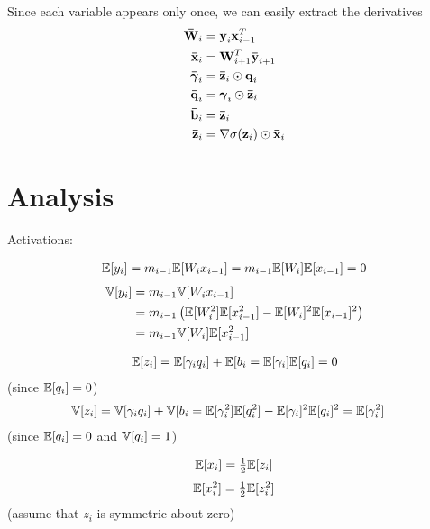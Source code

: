 Since each variable appears only once, we can easily extract the derivatives
\begin{align}
\boldsymbol{\mathbf{\bar{W}}}_{i} & = \boldsymbol{\mathbf{\bar{y}}}_{i} \boldsymbol{\mathbf{x}}_{i - 1}^T \\
\boldsymbol{\mathbf{\bar{x}}}_{i} & = \boldsymbol{\mathbf{W}}_{i+1}^{T} \boldsymbol{\mathbf{\bar{y}}}_{i+1} \\
\boldsymbol{\mathbf{\bar{\gamma}}}_{i} & = \boldsymbol{\mathbf{\bar{z}}}_{i} \odot \boldsymbol{\mathbf{q}}_{i} \\
\boldsymbol{\mathbf{\bar{q}}}_{i} & = \boldsymbol{\mathbf{\gamma}}_{i} \odot \boldsymbol{\mathbf{\bar{z}}}_{i} \\
\boldsymbol{\mathbf{\bar{b}}}_{i} & = \boldsymbol{\mathbf{\bar{z}}}_{i} \\
\boldsymbol{\mathbf{\bar{z}}}_{i} & = \nabla\sigma(\boldsymbol{\mathbf{z}}_{i}) \odot \boldsymbol{\mathbf{\bar{x}}}_{i}
\end{align}

\section{Analysis}

Activations:

\begin{align}
\mathbb{E}[y_{i}] = m_{i-1} \mathbb{E}[W_{i} x_{i-1}] = m_{i-1} \mathbb{E}[W_{i}] \mathbb{E}[x_{i-1}] = 0
\end{align}
\begin{align}
\mathbb{V}[y_{i}] & = m_{i-1} \mathbb{V}[W_{i} x_{i-1}] \\
  & = m_{i-1} \left( \mathbb{E}[W_{i}^2] \mathbb{E}[x_{i-1}^2] - \mathbb{E}[W_{i}]^2 \mathbb{E}[x_{i-1}]^2 \right) \\
  & = m_{i-1} \mathbb{V}[W_{i}] \mathbb{E}[x_{i-1}^2]
\end{align}

\begin{align}
\mathbb{E}[z_{i}] = \mathbb{E}[\gamma_{i} q_{i}] + \mathbb{E}[b_{i} = \mathbb{E}[\gamma_{i}] \mathbb{E}[q_{i}] = 0
\end{align}
(since $\mathbb{E}[q_{i}] = 0$)
\begin{align}
\mathbb{V}[z_{i}] & = \mathbb{V}[\gamma_{i} q_{i}] + \mathbb{V}[b_{i} = \mathbb{E}[\gamma_{i}^2] \mathbb{E}[q_{i}^2] - \mathbb{E}[\gamma_{i}]^2 \mathbb{E}[q_{i}]^2 = \mathbb{E}[\gamma_{i}^2]
\end{align}
(since $\mathbb{E}[q_{i}] = 0$ and $\mathbb{V}[q_{i}] = 1$)

\begin{align}
\mathbb{E}[x_{i}] = \tfrac{1}{2} \mathbb{E}[z_{i}]
\end{align}
\begin{align}
\mathbb{E}[x_{i}^2] = \tfrac{1}{2} \mathbb{E}[z_{i}^2]
\end{align}
(assume that $z_{i}$ is symmetric about zero)

